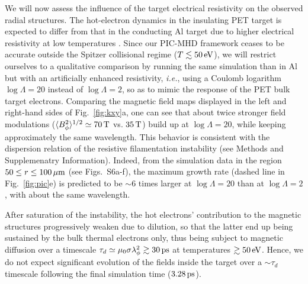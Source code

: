 \documentclass[aps,twocolumn,showpacs,superscriptaddress]{revtex4}
\begin{document}
We will now assess the influence of the target electrical resistivity on the observed radial structures. The hot-electron dynamics in the insulating PET target is expected to differ from that in the conducting Al target due to higher electrical resistivity at low temperatures \cite{PRL_Fuchs_2003, PRL_McKenna_2011}. Since our PIC-MHD framework ceases to be accurate outside the Spitzer collisional regime ($T\lesssim 50\,\rm eV$), we will restrict ourselves to a qualitative comparison by running the same simulation than in Al but with an artificially enhanced resistivity, \emph{i.e.}, using a Coulomb logarithm $\log \Lambda = 20$ instead of $\log \Lambda = 2$, so as to mimic the response of the PET bulk target electrons. Comparing the magnetic field maps displayed in the left and right-hand sides of Fig.~\ref{fig:kxy}a, one can see that about twice stronger field modulations ($\langle B_\phi^2 \rangle^{1/2} \simeq 70\,\rm T$ vs. $35\,\rm T$) build up at $\log \Lambda = 20$, while keeping approximately the same wavelength. This behavior is consistent with the dispersion relation of the resistive filamentation instability (see Methods and Supplemenatry Information). Indeed, from the simulation data in the region $50 \le r \le 100\,\rm \mu m$ (see Figs.~S6a-f), the maximum growth rate (dashed line in Fig.~\ref{fig:pic}e) is predicted to be $\sim 6$ times larger at $\log \Lambda = 20$ than at $\log \Lambda = 2$, with about the same wavelength. 

After saturation of the instability, the hot electrons' contribution to the magnetic structures progressively weaken due to dilution, so that the latter end up being sustained by the bulk thermal electrons only, thus being subject to magnetic diffusion over a timescale $\tau_d \simeq \mu_0 \sigma \lambda_\phi^2 \gtrsim 30\,\rm ps$ at temperatures $\gtrsim 50\,\rm eV$. Hence, we do not expect significant evolution of the fields inside the target over a $\sim \tau_d$ timescale following the final simulation time ($3.28\,\rm ps$).
\end{document}
